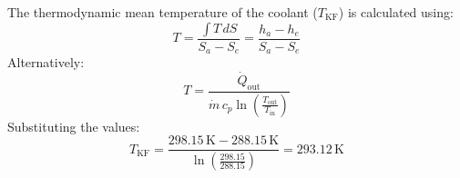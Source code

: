 The thermodynamic mean temperature of the coolant (\( T_{\text{KF}} \)) is calculated using:  
\[
T = \frac{\int T \, dS}{S_a - S_e} = \frac{h_a - h_e}{S_a - S_e}
\]  
Alternatively:  
\[
T = \frac{\dot{Q}_{\text{out}}}{\dot{m} \, c_p \ln\left(\frac{T_{\text{out}}}{T_{\text{in}}}\right)}
\]  
Substituting the values:  
\[
T_{\text{KF}} = \frac{298.15 \, \text{K} - 288.15 \, \text{K}}{\ln\left(\frac{298.15}{288.15}\right)} = 293.12 \, \text{K}
\]
